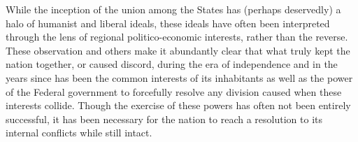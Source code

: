 \documentclass[a4paper]{article}
\begin{document}
While the inception of the union among the States has (perhaps deservedly) a halo of humanist and liberal ideals, these ideals have often been interpreted through the lens of regional politico-economic interests, rather than the reverse. These observation and others make it abundantly clear that what truly kept the nation together, or caused discord, during the era of independence and in the years since has been the common interests of its inhabitants as well as the power of the Federal government to forcefully resolve any division caused when these interests collide. Though the exercise of these powers has often not been entirely successful, it has been necessary for the nation to reach a resolution to its internal conflicts while still intact.


\printbibliography
\end{document}
